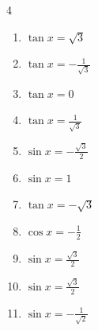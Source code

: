 \begin{multicols}{4}
\begin{enumerate}
  \item $\displaystyle \tan{x}  = \sqrt{3}$


  \item $\displaystyle \tan{x}  = -\frac{1}{\sqrt{3}}$


  \item $\displaystyle \tan{x}  = 0$

        \phantom{$\displaystyle x = 0 , \pi$}

  \item $\displaystyle \tan{x}  = \frac{1}{\sqrt{3}}$


\columnbreak %

\resetques

  \item $\displaystyle \sin{x}  = -\frac{\sqrt{3}}{2}$


  \item $\displaystyle \sin{x}  = 1$


  \item $\displaystyle \tan{x}  = -\sqrt{3}$


  \item $\displaystyle \cos{x}  = -\frac{1}{2}$


  \item $\displaystyle \sin{x}  = \frac{\sqrt{3}}{2}$


  \item $\displaystyle \sin{x}  = \frac{\sqrt{3}}{2}$


  \item $\displaystyle \sin{x}  = -\frac{1}{\sqrt{2}}$


\end{enumerate}
\end{multicols}
